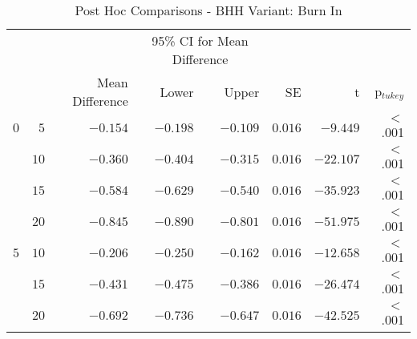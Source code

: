 \begin{table}[htbp]
      \centering
      \caption{Post Hoc Comparisons - BHH Variant: Burn In}
      \label{tab:results:burn_in:post_hoc}%
      \par\bigskip
      \resizebox{\textwidth}{!}
      {
            \begin{tabular}{lrrrrrrr}
                  \toprule
                  \multicolumn{1}{c}{} & \multicolumn{1}{c}{} & \multicolumn{1}{c}{} & \multicolumn{2}{c}{95\% CI for Mean Difference} & \multicolumn{1}{c}{} & \multicolumn{1}{c}{} & \multicolumn{1}{c}{}               \\
                  \cline{4-5}
                  $ $                  & $ $                  & Mean Difference      & Lower                                           & Upper                & SE                   & t                    & p$_{tukey}$ \\
                  \cmidrule[0.4pt]{1-8}
                  $0$                  & $5$                  & $-0.154$             & $-0.198$                                        & $-0.109$             & $0.016$              & $-9.449$             & $<$ .001    \\
                  $ $                  & $10$                 & $-0.360$             & $-0.404$                                        & $-0.315$             & $0.016$              & $-22.107$            & $<$ .001    \\
                                       & $15$                 & $-0.584$             & $-0.629$                                        & $-0.540$             & $0.016$              & $-35.923$            & $<$ .001    \\
                                       & $20$                 & $-0.845$             & $-0.890$                                        & $-0.801$             & $0.016$              & $-51.975$            & $<$ .001    \\
                  $5$                  & $10$                 & $-0.206$             & $-0.250$                                        & $-0.162$             & $0.016$              & $-12.658$            & $<$ .001    \\
                  $ $                  & $15$                 & $-0.431$             & $-0.475$                                        & $-0.386$             & $0.016$              & $-26.474$            & $<$ .001    \\
                                       & $20$                 & $-0.692$             & $-0.736$                                        & $-0.647$             & $0.016$              & $-42.525$            & $<$ .001    \\

\end{tabular}}
\end{table}
